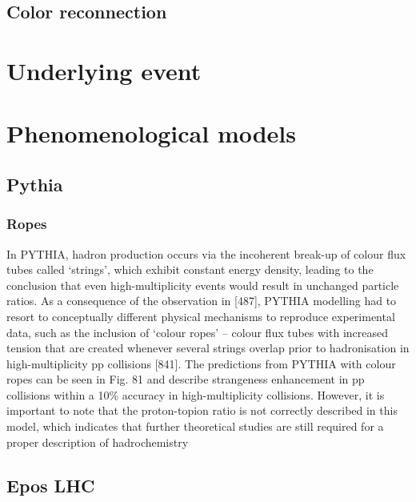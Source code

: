 \subsection{Color reconnection}

\section{Underlying event}

\section{Phenomenological models}

\subsection{Pythia}

\subsubsection{Ropes}

In PYTHIA, hadron production occurs via the incoherent break-up of colour flux tubes called ‘strings’,
which exhibit constant energy density, leading to the conclusion that even high-multiplicity events would
result in unchanged particle ratios. As a consequence of the observation in [487], PYTHIA modelling
had to resort to conceptually different physical mechanisms to reproduce experimental data, such as the
inclusion of ‘colour ropes’ – colour flux tubes with increased tension that are created whenever several
strings overlap prior to hadronisation in high-multiplicity pp collisions [841]. The predictions from
PYTHIA with colour ropes can be seen in Fig. 81 and describe strangeness enhancement in pp collisions
within a 10\% accuracy in high-multiplicity collisions. However, it is important to note that the proton-topion ratio is not correctly described in this model, which indicates that further theoretical studies are still
required for a proper description of hadrochemistry

\subsection{Epos LHC}

